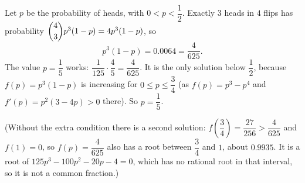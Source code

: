 Let $p$ be the probability of heads, with $0<p<\dfrac12$. Exactly $3$ heads in $4$ flips has probability $\dbinom43p^3(1-p)=4p^3(1-p)$, so
\[p^3(1-p)=0.0064=\dfrac{4}{625}.\]
The value $p=\dfrac15$ works: $\dfrac1{125}\cdot\dfrac45=\dfrac4{625}$. It is the only solution below $\dfrac12$, because $f(p)=p^3(1-p)$ is increasing for $0\le p\le\dfrac34$ (as $f(p)=p^3-p^4$ and $f'(p)=p^2(3-4p)>0$ there). So $p=\boxed{\dfrac15}$.

(Without the extra condition there is a second solution: $f\left(\dfrac34\right)=\dfrac{27}{256}>\dfrac4{625}$ and $f(1)=0$, so $f(p)=\dfrac{4}{625}$ also has a root between $\dfrac34$ and $1$, about $0.9935$. It is a root of $125p^3-100p^2-20p-4=0$, which has no rational root in that interval, so it is not a common fraction.)
